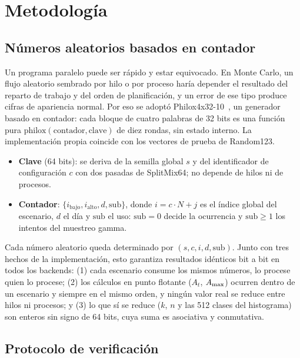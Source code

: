 \section{Metodología}
\label{sec:metodologia}

\subsection{Números aleatorios basados en contador}

Un programa paralelo puede ser rápido y estar equivocado. En Monte Carlo, un flujo aleatorio sembrado por hilo o por proceso haría depender el resultado del reparto de trabajo y del orden de planificación, y un error de ese tipo produce cifras de apariencia normal. Por eso se adoptó Philox4x32-10~\cite{salmon2011}, un generador basado en contador: cada bloque de cuatro palabras de 32 bits es una función pura $\text{philox}(\text{contador}, \text{clave})$ de diez rondas, sin estado interno. La implementación propia coincide con los vectores de prueba de Random123.

\begin{itemize}
  \item \textbf{Clave} (64 bits): se deriva de la semilla global $s$ y del identificador de configuración $c$ con dos pasadas de SplitMix64; no depende de hilos ni de procesos.
  \item \textbf{Contador}: $\{i_{\text{bajo}}, i_{\text{alto}}, d, \text{sub}\}$, donde $i = c\cdot N + j$ es el índice global del escenario, $d$ el día y $\text{sub}$ el uso: $\text{sub} = 0$ decide la ocurrencia y $\text{sub} \ge 1$ los intentos del muestreo gamma.
\end{itemize}

Cada número aleatorio queda determinado por $(s, c, i, d, \text{sub})$. Junto con tres hechos de la implementación, esto garantiza resultados idénticos bit a bit en todos los backends: (1) cada escenario consume los mismos números, lo procese quien lo procese; (2) los cálculos en punto flotante ($A_t$, $A_{\max}$) ocurren dentro de un escenario y siempre en el mismo orden, y ningún valor real se reduce entre hilos ni procesos; y (3) lo que sí se reduce ($k$, $n$ y las 512 clases del histograma) son enteros sin signo de 64 bits, cuya suma es asociativa y conmutativa.

\subsection{Protocolo de verificación}

